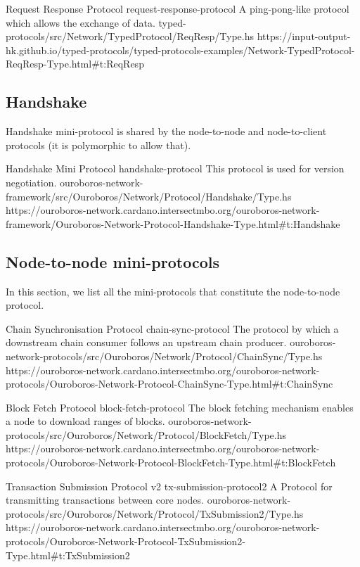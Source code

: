 \miniEntry
    {Request Response Protocol}
    {request-response-protocol}
    {A ping-pong-like protocol which allows the exchange of data.}
    {typed-protocols/src/Network/TypedProtocol/ReqResp/Type.hs}
    {https://input-output-hk.github.io/typed-protocols/typed-protocols-examples/Network-TypedProtocol-ReqResp-Type.html\#t:ReqResp}

\subsection{Handshake}

Handshake mini-protocol is shared by the node-to-node and node-to-client
protocols (it is polymorphic to allow that).

\miniEntry
    {Handshake Mini Protocol}
    {handshake-protocol}
    {This protocol is used for version negotiation.}
    {ouroboros-network-framework/src/Ouroboros/Network/Protocol/Handshake/Type.hs}
    {https://ouroboros-network.cardano.intersectmbo.org/ouroboros-network-framework/Ouroboros-Network-Protocol-Handshake-Type.html\#t:Handshake}

\subsection{Node-to-node mini-protocols}

In this section, we list all the mini-protocols that constitute the node-to-node protocol.

\miniEntry
    {Chain Synchronisation Protocol}
    {chain-sync-protocol}
    {The protocol by which a downstream chain consumer follows an upstream chain producer.}
    {ouroboros-network-protocols/src/Ouroboros/Network/Protocol/ChainSync/Type.hs}
    {https://ouroboros-network.cardano.intersectmbo.org/ouroboros-network-protocols/Ouroboros-Network-Protocol-ChainSync-Type.html\#t:ChainSync}

\miniEntry
    {Block Fetch Protocol}
    {block-fetch-protocol}
    {The block fetching mechanism enables a node to download ranges of blocks.}
    {ouroboros-network-protocols/src/Ouroboros/Network/Protocol/BlockFetch/Type.hs}
    {https://ouroboros-network.cardano.intersectmbo.org/ouroboros-network-protocols/Ouroboros-Network-Protocol-BlockFetch-Type.html\#t:BlockFetch}

\miniEntry
    {Transaction Submission Protocol v2}
    {tx-submission-protocol2}
    {A Protocol for transmitting transactions between core nodes.}
    {ouroboros-network-protocols/src/Ouroboros/Network/Protocol/TxSubmission2/Type.hs}
    {https://ouroboros-network.cardano.intersectmbo.org/ouroboros-network-protocols/Ouroboros-Network-Protocol-TxSubmission2-Type.html\#t:TxSubmission2}

